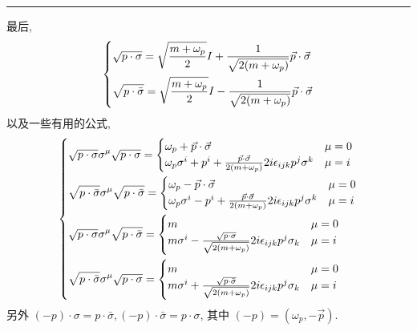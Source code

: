 \begin{itemize}
\begin{tcolorbox}[title=proof:]
		\noindent\rule[0.5ex]{\linewidth}{0.5pt} %
		
		最后,
		\begin{equation}
			\begin{dcases}
				\sqrt{p \cdot \sigma} = \sqrt{\frac{m + \omega_p}{2}} I + \frac{1}{\sqrt{2 (m + \omega_p)}} \vec{p} \cdot \vec{\sigma} \\
				\sqrt{p \cdot \bar{\sigma}} = \sqrt{\frac{m + \omega_p}{2}} I - \frac{1}{\sqrt{2 (m + \omega_p)}} \vec{p} \cdot \vec{\sigma}
			\end{dcases}
		\end{equation}
		以及一些有用的公式,
		\begin{equation}
			\begin{dcases}
				\sqrt{p \cdot \sigma} \sigma^\mu \sqrt{p \cdot \sigma} = \begin{cases}
					\omega_p + \vec{p} \cdot \vec{\sigma} & \mu = 0 \\
					\omega_p \sigma^i + p^i + \frac{\vec{p} \cdot \vec{\sigma}}{2 (m + \omega_p)} 2 i \epsilon_{i j k} p^j \sigma^k & \mu = i
				\end{cases} \\
				\sqrt{p \cdot \bar{\sigma}} \sigma^\mu \sqrt{p \cdot \bar{\sigma}} = \begin{cases}
					\omega_p - \vec{p} \cdot \vec{\sigma} & \mu = 0 \\
					\omega_p \sigma^i - p^i + \frac{\vec{p} \cdot \vec{\sigma}}{2 (m + \omega_p)} 2 i \epsilon_{i j k} p^j \sigma^k & \mu = i
				\end{cases} \\
				\sqrt{p \cdot \sigma} \sigma^\mu \sqrt{p \cdot \bar{\sigma}} = \begin{cases}
					m & \mu = 0 \\
					m \sigma^i - \frac{\sqrt{p \cdot \sigma}}{\sqrt{2 (m + \omega_p)}} 2 i \epsilon_{i j k} p^j \sigma_k & \mu = i
				\end{cases} \\
				\sqrt{p \cdot \bar{\sigma}} \sigma^\mu \sqrt{p \cdot \sigma} = \begin{cases}
					m & \mu = 0 \\
					m \sigma^i + \frac{\sqrt{p \cdot \bar{\sigma}}}{\sqrt{2 (m + \omega_p)}} 2 i \epsilon_{i j k} p^j \sigma_k & \mu = i
				\end{cases}
			\end{dcases}
		\end{equation}
		另外 $(- p) \cdot \sigma = p \cdot \bar{\sigma}, (- p) \cdot \bar{\sigma} = p \cdot \sigma$, 其中 $(- p) = (\omega_p, - \vec{p})$.
	\end{tcolorbox}
	

\end{itemize}
